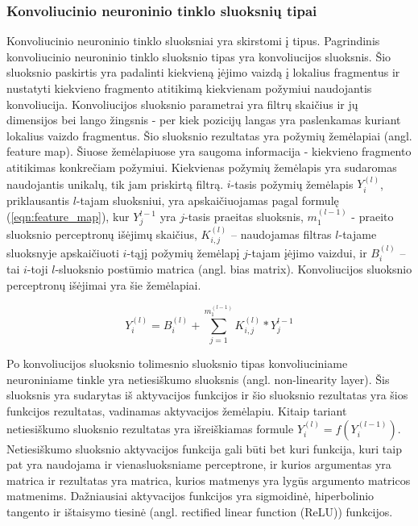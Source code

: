\subsubsection{Konvoliucinio neuroninio tinklo sluoksnių tipai}

Konvoliucinio neuroninio tinklo sluoksniai yra skirstomi į tipus. Pagrindinis konvoliucinio neuroninio tinklo sluoksnio tipas yra konvoliucijos sluoksnis. Šio sluoksnio paskirtis yra padalinti kiekvieną įėjimo vaizdą į lokalius fragmentus ir nustatyti kiekvieno fragmento atitikimą kiekvienam požymiui naudojantis konvoliucija. Konvoliucijos sluoksnio parametrai yra filtrų skaičius ir jų dimensijos bei lango žingsnis - per kiek pozicijų langas yra paslenkamas kuriant lokalius vaizdo fragmentus. Šio sluoksnio rezultatas yra požymių žemėlapiai (angl. feature map). Šiuose žemėlapiuose yra saugoma informacija - kiekvieno fragmento atitikimas konkrečiam požymiui. Kiekvienas požymių žemėlapis yra sudaromas naudojantis unikalų, tik jam priskirtą filtrą. $i$-tasis požymių žemėlapis $Y_i^{(l)}$, priklausantis $l$-tajam sluoksniui, yra apskaičiuojamas pagal formulę (\ref{eqn:feature_map}), kur $Y_j^{l-1}$ yra $j$-tasis praeitas sluoksnis, $m_1^{(l-1)}$ - praeito sluoksnio perceptronų išėjimų skaičius, $K_{i,j}^{(l)}$ -- naudojamas filtras $l$-tajame sluoksnyje apskaičiuoti $i$-tąjį požymių žemėlapį $j$-tajam įėjimo vaizdui, ir $B_i^{(l)}$ -- tai $i$-toji $l$-sluoksnio postūmio matrica (angl. bias matrix). Konvoliucijos sluoksnio perceptronų išėjimai yra šie žemėlapiai.

\begin{equation}
\label{eqn:feature_map}
	Y_i^{(l)} = B_i^{(l)} + \sum_{j = 1}^{m_1^{(l-1)}} K_{i,j}^{(l)} * Y_j^{l-1}
\end{equation}


Po konvoliucijos sluoksnio tolimesnio sluoksnio tipas konvoliuciniame neuroniniame tinkle yra netiesiškumo sluoksnis (angl. non-linearity layer). Šis sluoksnis yra sudarytas iš aktyvacijos funkcijos ir šio sluoksnio rezultatas yra šios funkcijos rezultatas, vadinamas aktyvacijos žemėlapiu. Kitaip tariant netiesiškumo sluoksnio rezultatas yra išreiškiamas formule $Y_i^{(l)} = f(Y_i^{(l - 1)})$. Netiesiškumo sluoksnio aktyvacijos funkcija gali būti bet kuri funkcija, kuri taip pat yra naudojama ir vienasluoksniame perceptrone, ir kurios argumentas yra matrica ir rezultatas yra matrica, kurios matmenys yra lygūs argumento matricos matmenims. Dažniausiai aktyvacijos funkcijos yra sigmoidinė, hiperbolinio tangento ir ištaisymo tiesinė (angl. rectified linear function (ReLU)) funkcijos.

